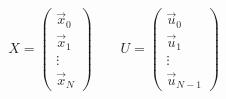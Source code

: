 \documentclass{article}
\begin{document}
\thispagestyle{empty}

$$
X=\begin{pmatrix}\vec{x}_0\\ \vec{x}_1 \\ \vdots \\ \vec{x}_N\end{pmatrix} 
\qquad
U=\begin{pmatrix}\vec{u}_0\\ \vec{u}_1 \\ \vdots \\ \vec{u}_{N-1}\end{pmatrix} 
$$
\end{document}
